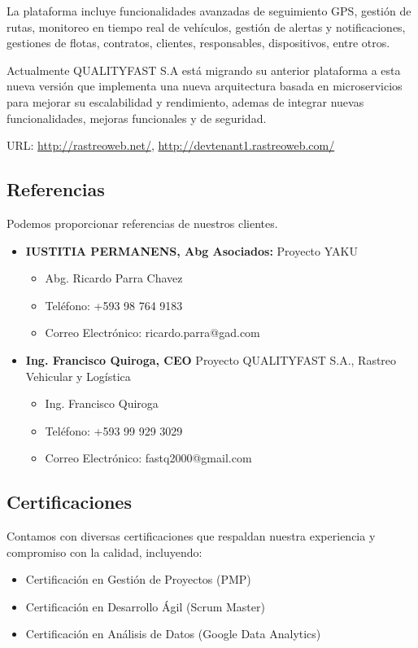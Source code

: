 \begin{itemize}
        La plataforma incluye funcionalidades avanzadas de seguimiento GPS, gestión de rutas, monitoreo en tiempo real de vehículos, gestión de alertas y notificaciones, gestiones de flotas, contratos, clientes, responsables, dispositivos, entre otros.
        
        Actualmente QUALITYFAST S.A está migrando su anterior plataforma a esta nueva versión que implementa una nueva arquitectura basada en microservicios para mejorar su escalabilidad y rendimiento, ademas de integrar nuevas funcionalidades, mejoras funcionales y de seguridad.

        URL: \url{http://rastreoweb.net/}, \url{http://devtenant1.rastreoweb.com/}
\end{itemize}

\subsection{Referencias}
Podemos proporcionar referencias de nuestros clientes.
\begin{itemize}
    \item \textbf{IUSTITIA PERMANENS, Abg Asociados:} Proyecto YAKU
    \begin{itemize}
        \item Abg. Ricardo Parra Chavez
        \item Teléfono: +593 98 764 9183
        \item Correo Electrónico: ricardo.parra@gad.com
    \end{itemize}
    \item \textbf{Ing. Francisco Quiroga, CEO} Proyecto QUALITYFAST S.A., Rastreo Vehicular y Logística
    \begin{itemize}
        \item Ing. Francisco Quiroga
        \item Teléfono: +593 99 929 3029
        \item Correo Electrónico: fastq2000@gmail.com
    \end{itemize}
\end{itemize}

\subsection{Certificaciones}
Contamos con diversas certificaciones que respaldan nuestra experiencia y compromiso con la calidad, incluyendo:
\begin{itemize}
    \item Certificación en Gestión de Proyectos (PMP)
    \item Certificación en Desarrollo Ágil (Scrum Master)
    \item Certificación en Análisis de Datos (Google Data Analytics)
\end{itemize}
